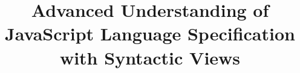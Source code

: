 \documentclass[sigconf,review,anonymous]{acmart}
\begin{document}
\title[Advanced Understanding of JavaScript Language Specification
using Syntactic Views]
{Advanced Understanding of JavaScript Language Specification\\
with Syntactic Views}




% 
% 
% 


\end{document}
